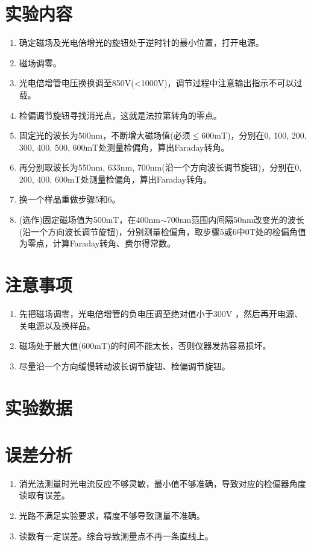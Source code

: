 \documentclass[a4paper]{article}
\begin{document}
\section{实验内容}
\begin{enumerate}
\item 确定磁场及光电倍增光的旋钮处于逆时针的最小位置，打开电源。
\item 磁场调零。
\item 光电倍增管电压换换调至850V(<1000V)，调节过程中注意输出指示不可以过载。
\item {}检偏调节旋钮寻找消光点，这就是法拉第转角的零点。
\item 固定光的波长为500nm，不断增大磁场值(必须$\leq$600mT)，分别在0, 100, 200, 300, 400, 500, 600mT处测量检偏角，算出Faraday转角。
\item 再分别取波长为550nm, 633nm, 700nm(沿一个方向波长调节旋钮)，分别在0, 200, 400, 600mT处测量检偏角，算出Faraday转角。
\item 换一个样品重做步骤5和6。
\item (选作)固定磁场值为500mT，在400nm$\sim$700nm范围内间隔50nm改变光的波长(沿一个方向波长调节旋钮)，分别测量检偏角，取步骤5或6中0T处的检偏角值为零点，计算Faraday转角、费尔得常数。
\end{enumerate}

\section{注意事项}
\begin{enumerate}
\item 先把磁场调零，光电倍增管的负电压调至绝对值小于300V ，然后再开电源、关电源以及换样品。
\item 磁场处于最大值(600mT)的时间不能太长，否则仪器发热容易损坏。
\item 尽量沿一个方向缓慢转动波长调节旋钮、检偏调节旋钮。
\end{enumerate}

\section{实验数据}

\section{误差分析}
\begin{enumerate}
\item 消光法测量时光电流反应不够灵敏，最小值不够准确，导致对应的检偏器角度读取有误差。
\item 光路不满足实验要求，精度不够导致测量不准确。
\item 读数有一定误差。综合导致测量点不再一条直线上。
\end{enumerate}
\end{document}
